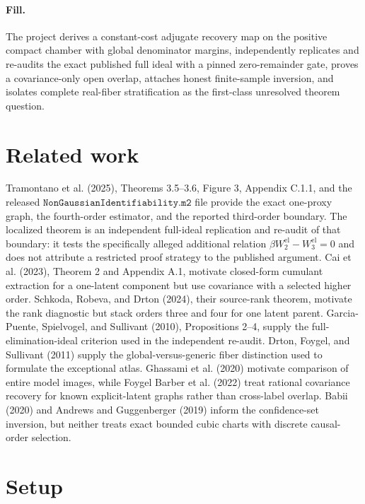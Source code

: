 \documentclass{article}
\begin{document}
\paragraph{Fill.} The project derives a constant-cost adjugate recovery map on the positive compact chamber with global denominator margins, independently replicates and re-audits the exact published full ideal with a pinned zero-remainder gate, proves a covariance-only open overlap, attaches honest finite-sample inversion, and isolates complete real-fiber stratification as the first-class unresolved theorem question.

\section{Related work}

Tramontano et al. (2025), Theorems 3.5--3.6, Figure 3, Appendix C.1.1, and the released \(\texttt{NonGaussianIdentifiability.m2}\) file provide the exact one-proxy graph, the fourth-order estimator, and the reported third-order boundary. The localized theorem is an independent full-ideal replication and re-audit of that boundary: it tests the specifically alleged additional relation \(\beta W_2^{\mathrm{el}}-W_3^{\mathrm{el}}=0\) and does not attribute a restricted proof strategy to the published argument. Cai et al. (2023), Theorem 2 and Appendix A.1, motivate closed-form cumulant extraction for a one-latent component but use covariance with a selected higher order. Schkoda, Robeva, and Drton (2024), their source-rank theorem, motivate the rank diagnostic but stack orders three and four for one latent parent. Garcia-Puente, Spielvogel, and Sullivant (2010), Propositions 2--4, supply the full-elimination-ideal criterion used in the independent re-audit. Drton, Foygel, and Sullivant (2011) supply the global-versus-generic fiber distinction used to formulate the exceptional atlas. Ghassami et al. (2020) motivate comparison of entire model images, while Foygel Barber et al. (2022) treat rational covariance recovery for known explicit-latent graphs rather than cross-label overlap. Babii (2020) and Andrews and Guggenberger (2019) inform the confidence-set inversion, but neither treats exact bounded cubic charts with discrete causal-order selection.

\section{Setup}
\end{document}

